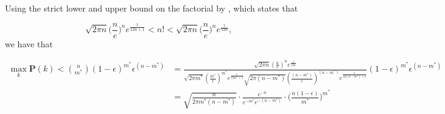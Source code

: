 \documentclass{article}
\newcommand{\eps}{\epsilon}
\begin{document}
Using the strict lower and upper bound on the factorial by \cite{robbins}, which states that 

$$
\sqrt{2\pi n}\bigg(\frac{n}{e}\bigg)^n e^{\frac{1}{12n+1}} < n! < \sqrt{2\pi n}\bigg(\frac{n}{e}\bigg)^n e^{\frac{1}{12n}},
$$
we have that 

\begin{align*}
\max_k \mathbf{P}(k) < \binom{n}{m^*} (1-\eps)^{m^*}\eps^{(n-m^*)}  &=\frac{\sqrt{2\pi n} \left(\frac{n}{e}\right)^n e^{\frac{1}{12n}}}{\sqrt{2\pi m^*} \left(\frac{m^*}{e}\right)^{m^*} e^{\frac{1}{12m^* + 1}}\sqrt{2\pi (n-m^*)} \left(\frac{(n-m^*)}{e}\right)^{(n-m^*)} e^{\frac{1}{12(n-m^*)+1}}} (1-\eps)^{m^*}\eps^{(n-m^*)}  \\
&= \sqrt{\frac{n}{2 \pi m^* (n-m^*)}} \cdot \frac{e^{-n}}{e^{-m^*}e^{-(n-m^*)}}\cdot\bigg(\frac{n(1-\eps)}{m^*}\bigg)^{m^*}
\end{align*}
\end{document}
